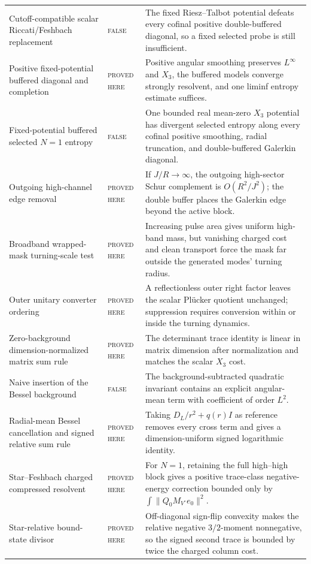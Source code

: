 \documentclass[11pt]{article}
\newcommand{\statusproved}{\textcolor{proved}{\textsc{proved here}}}
\newcommand{\statusfailed}{\textcolor{failed}{\textsc{false}}}
\theoremstyle{definition}
\theoremstyle{remark}
\begin{document}
\begin{longtable}{>{\raggedright\arraybackslash}p{}>{\raggedright\arraybackslash}p{}>{\raggedright\arraybackslash}p{}}
Cutoff-compatible scalar Riccati/Feshbach replacement & \statusfailed & The fixed Riesz--Talbot potential defeats every cofinal positive double-buffered diagonal, so a fixed selected probe is still insufficient. \\
Positive fixed-potential buffered diagonal and completion & \statusproved & Positive angular smoothing preserves $L^\infty$ and $X_3$, the buffered models converge strongly resolvent, and one liminf entropy estimate suffices. \\
Fixed-potential buffered selected $N=1$ entropy & \statusfailed & One bounded real mean-zero $X_3$ potential has divergent selected entropy along every cofinal positive smoothing, radial truncation, and double-buffered Galerkin diagonal. \\
Outgoing high-channel edge removal & \statusproved & If $J/R\to\infty$, the outgoing high-sector Schur complement is $O(R^2/J^2)$; the double buffer places the Galerkin edge beyond the active block. \\
Broadband wrapped-mask turning-scale test & \statusproved & Increasing pulse area gives uniform high-band mass, but vanishing charged cost and clean transport force the mask far outside the generated modes' turning radius. \\
Outer unitary converter ordering & \statusproved & A reflectionless outer right factor leaves the scalar Pl\"ucker quotient unchanged; suppression requires conversion within or inside the turning dynamics. \\
Zero-background dimension-normalized matrix sum rule & \statusproved & The determinant trace identity is linear in matrix dimension after normalization and matches the scalar $X_3$ cost. \\
Naive insertion of the Bessel background & \statusfailed & The background-subtracted quadratic invariant contains an explicit angular-mean term with coefficient of order $L^2$. \\
Radial-mean Bessel cancellation and signed relative sum rule & \statusproved & Taking $D_L/r^2+q(r)I$ as reference removes every cross term and gives a dimension-uniform signed logarithmic identity. \\
Star--Feshbach charged compressed resolvent & \statusproved & For $N=1$, retaining the full high--high block gives a positive trace-class negative-energy correction bounded only by $\int\|Q_0M_{V^\circ}e_0\|^2$. \\
Star-relative bound-state divisor & \statusproved & Off-diagonal sign-flip convexity makes the relative negative $3/2$-moment nonnegative, so the signed second trace is bounded by twice the charged column cost. \\

\end{longtable}
\end{document}

